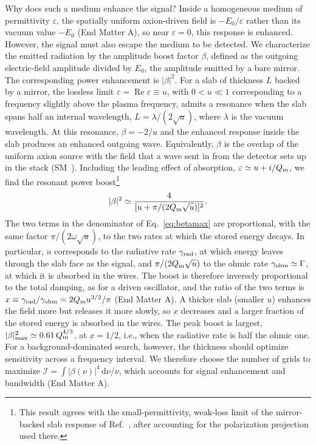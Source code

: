 \documentclass[
  aps,prl,reprint,superscriptaddress,
  amsmath,amssymb,floatfix,nofootinbib
]{revtex4-2}
\newcommand{\Qm}{Q_{\rm m}}
\newcommand{\dd}{\mathrm d}
\begin{document}
Why does such a medium enhance the signal? Inside a homogeneous medium of permittivity $\varepsilon$, the
spatially uniform axion-driven field is $-E_0/\varepsilon$ rather than its vacuum value $-E_0$ (End Matter A), so near $\varepsilon=0$, this response is enhanced. However, the signal must also escape the medium to be detected. We characterize the emitted radiation by the amplitude boost factor $\beta$, defined as the outgoing electric-field amplitude divided by $E_0$, the amplitude emitted by a bare mirror. The corresponding power enhancement is $|\beta|^2$. For a slab of thickness $L$ backed by a mirror, the lossless limit $\varepsilon=\operatorname{Re}\varepsilon
\equiv u$, with $0<u\ll1$ corresponding to a frequency
slightly above the plasma frequency, admits a resonance when the slab spans half an internal wavelength, $L=\lambda/(2\sqrt{u})$, where $\lambda$ is the vacuum wavelength. At this resonance, $\beta=-2/u$ and the enhanced response inside the slab produces an enhanced outgoing wave. Equivalently, $\beta$ is the overlap of the uniform axion source with the field that a wave sent in from the detector sets up in the stack (SM~\cite{SM}). Including the leading effect of absorption, $\varepsilon\simeq u+i/\Qm$, we find the resonant power boost\footnote{This result agrees with the small-permittivity,
weak-loss limit of the mirror-backed slab response of Ref.~\cite{Mehrani:2025ryc}, after accounting
for the polarization projection used there.}
\begin{equation}
|\beta|^2\simeq
\frac{4}{[u+\pi/(2\Qm\sqrt{u})]^2}.
\label{eq:betamax}
\end{equation}
The two terms in the denominator of Eq.~\eqref{eq:betamax} are proportional, with the same factor $\pi/(2\omega\sqrt u)$, to the two rates at which the stored energy decays. In particular, $u$ corresponds to the radiative rate $\gamma_{\rm rad}$, at which energy leaves through the slab face as the signal, and $\pi/(2\Qm\sqrt u)$ to the ohmic rate $\gamma_{\rm ohm}\simeq\Gamma$, at which it is absorbed in the wires. The boost is therefore inversely proportional to the total damping, as for a driven oscillator, and the ratio of the two terms is $x\equiv\gamma_{\rm rad}/\gamma_{\rm ohm}=2\Qm u^{3/2}/\pi$ (End Matter A). A thicker slab (smaller $u$) enhances the field more but releases it more slowly, so $x$ decreases and a larger fraction of the stored energy is absorbed in the wires. The peak boost is largest, $|\beta|^2_{\max}\simeq0.61\,\Qm^{4/3}$, at $x=1/2$, i.e., when the radiative rate is half the ohmic one. For a background-dominated search, however, the thickness should optimize sensitivity across a frequency interval. We therefore choose the number of grids to maximize $\mathcal I=\int|\beta(\nu)|^4\,\dd\nu/\nu$, which accounts for signal enhancement and bandwidth (End Matter A).
\end{document}
